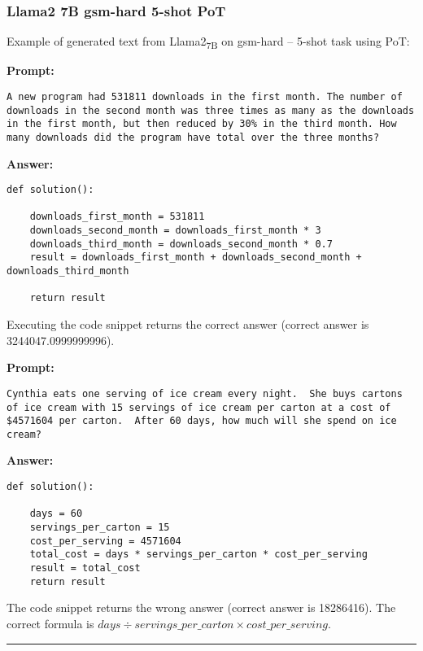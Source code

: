 	\subsubsection*{Llama2 7B gsm-hard 5-shot PoT}
	\noindent Example of generated text from Llama2\textsubscript{7B} on gsm-hard -- 5-shot task using PoT:
	\begin{displayquote}
		\textbf{Prompt:}
		\begin{Verbatim}[fontsize=\small,breaklines]
A new program had 531811 downloads in the first month. The number of downloads in the second month was three times as many as the downloads in the first month, but then reduced by 30% in the third month. How many downloads did the program have total over the three months?
	\end{Verbatim}
		\textbf{Answer:}
		\begin{Verbatim}[fontsize=\small,breaklines]
def solution():

    downloads_first_month = 531811
    downloads_second_month = downloads_first_month * 3
    downloads_third_month = downloads_second_month * 0.7
    result = downloads_first_month + downloads_second_month + downloads_third_month

    return result
	\end{Verbatim}
	\end{displayquote}
	Executing the code snippet returns the correct answer (correct answer is 3244047.0999999996).
	\begin{displayquote}
		\textbf{Prompt:}
		\begin{Verbatim}[fontsize=\small,breaklines]
Cynthia eats one serving of ice cream every night.  She buys cartons of ice cream with 15 servings of ice cream per carton at a cost of $4571604 per carton.  After 60 days, how much will she spend on ice cream?
	\end{Verbatim}
		\textbf{Answer:}
		\begin{Verbatim}[fontsize=\small,breaklines]
def solution():

    days = 60
    servings_per_carton = 15
    cost_per_serving = 4571604
    total_cost = days * servings_per_carton * cost_per_serving
    result = total_cost
    return result
	\end{Verbatim}
	\end{displayquote}
	The code snippet returns the wrong answer (correct answer is 18286416).
	The correct formula is $days \div servings\_per\_carton \times cost\_per\_serving$.

	\noindent\rule{\textwidth}{0.4pt}

